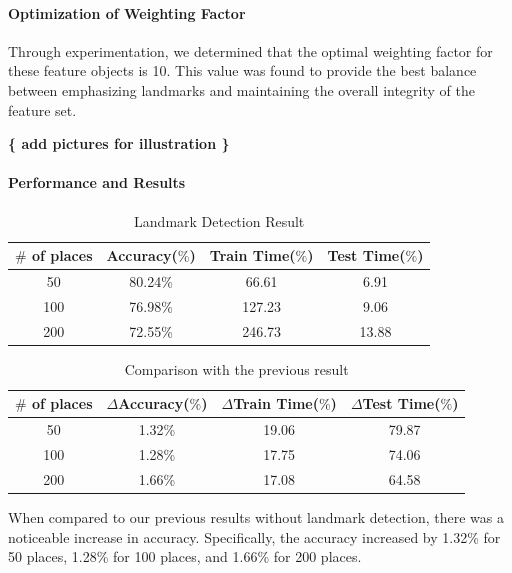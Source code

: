 \documentclass[conference]{IEEEtran}
\begin{document}
\paragraph{Optimization of Weighting Factor}

Through experimentation, we determined that the optimal weighting factor for these feature objects is 10. This value was found to provide the best balance between emphasizing landmarks and maintaining the overall integrity of the feature set.

\textbf{ \{ add pictures for illustration \} }

\paragraph{Performance and Results}

\begin{table}[h]
\centering
\caption{Landmark Detection Result}
\label{my-label}
\begin{tabular}{|c|c|c|c|}
\hline
$\#$ of places &  Accuracy($\%$)  &  Train Time($\%$)   &  Test Time($\%$)   \\ \hline
50 & 80.24\% & 66.61 & 6.91 \\ \hline
100 & 76.98\% & 127.23 & 9.06 \\ \hline
200 & 72.55\% & 246.73 & 13.88 \\ \hline
\end{tabular}
\end{table}

\begin{table}[h]
\centering
\caption{Comparison with the previous result}
\label{my-label}
\begin{tabular}{|c|c|c|c|}
\hline
$\#$ of places & $\Delta$Accuracy($\%$)  & $\Delta$Train Time($\%$)   & $\Delta$Test Time($\%$)   \\ \hline
50 & 1.32\% & 19.06 & 79.87 \\ \hline
100 & 1.28\% & 17.75 & 74.06 \\ \hline
200 & 1.66\% & 17.08 & 64.58 \\ \hline
\end{tabular}
\end{table}

When compared to our previous results without landmark detection, there was a noticeable increase in accuracy. Specifically, the accuracy increased by 1.32\% for 50 places, 1.28\% for 100 places, and 1.66\% for 200 places.
\end{document}
